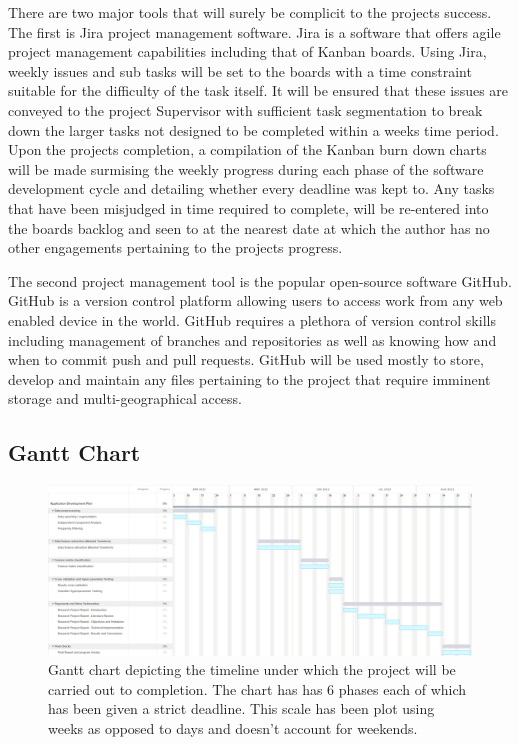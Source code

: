 \documentclass[12pt]{article}
\begin{document}
There are two major tools that will surely be complicit to the projects success. The first is Jira project management software. Jira is a software that offers agile project management capabilities including that of Kanban boards. Using Jira, weekly issues and sub tasks will be set to the boards with a time constraint suitable for the difficulty of the task itself. It will be ensured that these issues are conveyed to the project Supervisor with sufficient task segmentation to break down the larger tasks not designed to be completed within a weeks time period. Upon the projects completion, a compilation of the Kanban burn down charts will be made surmising the weekly progress during each phase of the software development cycle and detailing whether every deadline was kept to. Any tasks that have been misjudged in time required to complete, will be re-entered into the boards backlog and seen to at the nearest date at which the author has no other engagements pertaining to the projects progress.

The second project management tool is the popular open-source software GitHub. GitHub is a version control platform allowing users to access work from any web enabled device in the world. GitHub requires a plethora of version control skills including management of branches and repositories as well as knowing how and when to commit push and pull requests. GitHub will be used mostly to store, develop and maintain any files pertaining to the project that require imminent storage and multi-geographical access. 
\subsection{Gantt Chart}

\begin{landscape}
\begin{figure}[tb]
\centering
\includegraphics[width=1.7\textwidth]{Gantt.png}
\caption{\label{fig:Gantt} Gantt chart depicting the timeline under which the project will be carried out to completion. The chart has has 6 phases each of which has been given a strict deadline. This scale has been plot using weeks as opposed to days and doesn't account for weekends.}
\end{figure}
\end{landscape}
\end{document}
